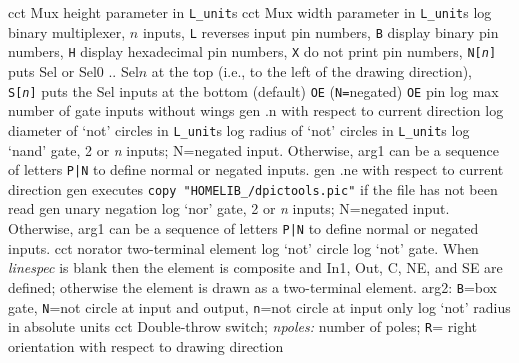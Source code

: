   {cct}
  {Mux height parameter in {\tt L\_unit}s}
  {cct}
  {Mux width parameter in {\tt L\_unit}s}
  {log}
  {binary multiplexer, $n$ inputs,
    {\tt L} reverses input pin numbers, {\tt B} display binary pin
    numbers, {\tt H} display hexadecimal pin numbers, {\tt X} do not
    print pin numbers, {\tt N[{\sl n}]} puts Sel or Sel$0$ .. Sel$n$
    at the top (i.e., to the left of the drawing direction), {\tt
    S[{\sl n}]} puts the Sel inputs at the bottom (default) {\tt OE}
    ({\tt N=}negated) {\tt OE} pin }
  {log}
  {max number of gate inputs without wings}
%
  {gen}
  {.n with respect to current direction}
  {log}
  {diameter of `not' circles in {\tt L\_unit}s}
  {log}
  {radius of `not' circles in {\tt L\_unit}s}
  {log}
  {`nand' gate, 2 or {\sl n\/} inputs; N=negated input.
   Otherwise, arg1 can be a sequence of letters {\tt P|N} to define
   normal or negated inputs.
    }
  {gen}
  {.ne with respect to current direction}
  {gen}
  {executes {\tt copy "HOMELIB\_/dpictools.pic"} if the file has
  not been read}
  {gen}
  {unary negation}
  {log}
  {`nor' gate, 2 or {\sl n\/} inputs; N=negated input.
   Otherwise, arg1 can be a sequence of letters {\tt P|N} to define
   normal or negated inputs.
    }
  {cct}
  { norator two-terminal element }
  {log}
  {`not' circle}
  {log}
  {`not' gate.
   When {\sl linespec} is blank then the element is composite and In1,
   Out, C, NE, and SE are defined; otherwise the element is drawn as a
   two-terminal element. arg2: {\tt B}=box gate, {\tt N}=not circle at
   input and output, {\tt n}=not circle at input only
    }
  {log}
  {`not' radius in absolute units}
  {cct}
  {Double-throw switch; {\sl npoles:} number of poles;
   {\tt R}= right orientation with respect to drawing direction
   }
